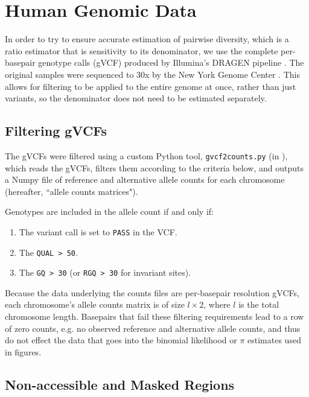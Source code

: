 \documentclass[11pt]{article}
\begin{document}
\section{Human Genomic Data}

In order to try to ensure accurate estimation of pairwise diversity, which is a
ratio estimator that is sensitivity to its denominator, we use the complete
per-basepair genotype calls (gVCF) produced by Illumina's DRAGEN pipeline
\parencite{Illumina_Inc2020-dk}. The original samples were sequenced to 30x by
the New York Genome Center \parencite{Byrska-Bishop2022-tn}. This allows for
filtering to be applied to the entire genome at once, rather than just
variants, so the denominator does not need to be estimated separately.

\subsection{Filtering gVCFs}
\label{supp:filter}

The gVCFs were filtered using a custom Python tool, \texttt{gvcf2counts.py} (in
), which reads the gVCFs, filters them according to
the criteria below, and outputs a Numpy  file of reference and
alternative allele counts for each chromosome (hereafter, ``allele counts
matrices").

Genotypes are included in the allele count if and only if:

\begin{enumerate}
  \item The variant call is set to \texttt{PASS} in the VCF.
  \item The \texttt{QUAL > 50}.
  \item The \texttt{GQ > 30} (or \texttt{RGQ > 30} for invariant sites).
\end{enumerate}

Because the data underlying the counts files are per-basepair resolution gVCFs,
each chromosome's allele counts matrix is of size $l \times 2$, where $l$ is
the total chromosome length. Basepairs that fail these filtering requirements
lead to a row of zero counts, e.g. no observed reference and alternative allele
counts, and thus do not effect the data that goes into the binomial likelihood
or $\pi$ estimates used in figures.

\subsection{Non-accessible and Masked Regions}
\label{supp:accessible}
\end{document}
